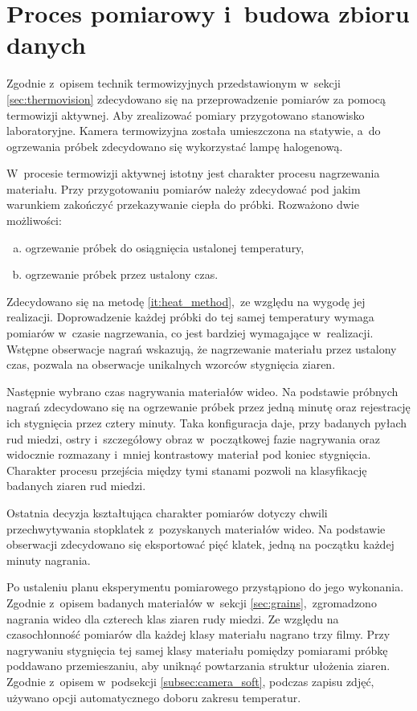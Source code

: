 \section{Proces pomiarowy i~budowa zbioru danych}
\label{sec:measure}
Zgodnie z~opisem technik termowizyjnych przedstawionym w~sekcji
\ref{sec:thermovision} zdecydowano się na przeprowadzenie pomiarów za pomocą
termowizji aktywnej.
Aby zrealizować pomiary przygotowano stanowisko laboratoryjne.
Kamera termowizyjna została umieszczona na statywie, a~do ogrzewania próbek
zdecydowano się wykorzystać lampę halogenową.

W~procesie termowizji aktywnej istotny jest charakter procesu nagrzewania
materiału.
Przy przygotowaniu pomiarów należy zdecydować pod jakim warunkiem zakończyć
przekazywanie ciepła do próbki.
Rozważono dwie możliwości:
\begin{enumerate}[a)]
	\item ogrzewanie próbek do osiągnięcia ustalonej temperatury,
	\item \label{it:heat_method}
	      ogrzewanie próbek przez ustalony czas.
\end{enumerate}
Zdecydowano się na metodę \ref{it:heat_method},~ze względu na wygodę jej
realizacji.
Doprowadzenie każdej próbki do tej samej temperatury wymaga pomiarów
w~czasie nagrzewania, co jest bardziej wymagające w~realizacji.
Wstępne obserwacje nagrań wskazują, że nagrzewanie materiału przez ustalony
czas, pozwala na obserwacje unikalnych wzorców stygnięcia ziaren.

Następnie wybrano czas nagrywania materiałów wideo.
Na podstawie próbnych nagrań zdecydowano się na ogrzewanie próbek przez jedną
minutę oraz rejestrację ich stygnięcia przez cztery minuty.
Taka konfiguracja daje, przy badanych pyłach rud miedzi, ostry i~szczegółowy
obraz w~początkowej fazie nagrywania oraz widocznie rozmazany i~mniej
kontrastowy materiał pod koniec stygnięcia.
Charakter procesu przejścia między tymi stanami pozwoli na klasyfikację
badanych ziaren rud miedzi.

Ostatnia decyzja kształtująca charakter pomiarów dotyczy chwili
przechwytywania stopklatek z~pozyskanych materiałów wideo.
Na podstawie obserwacji zdecydowano się eksportować pięć klatek, jedną
na początku każdej minuty nagrania.

Po ustaleniu planu eksperymentu pomiarowego przystąpiono do jego wykonania.
Zgodnie z~opisem badanych materiałów w~sekcji \ref{sec:grains},~zgromadzono
nagrania wideo dla czterech klas ziaren rudy miedzi.
Ze względu na czasochłonność pomiarów dla każdej klasy materiału nagrano trzy
filmy.
Przy nagrywaniu stygnięcia tej samej klasy materiału pomiędzy pomiarami
próbkę poddawano przemieszaniu, aby uniknąć powtarzania struktur
ułożenia ziaren.
Zgodnie z~opisem w~podsekcji \ref{subsec:camera_soft}, podczas zapisu
zdjęć, używano opcji automatycznego doboru zakresu temperatur.

